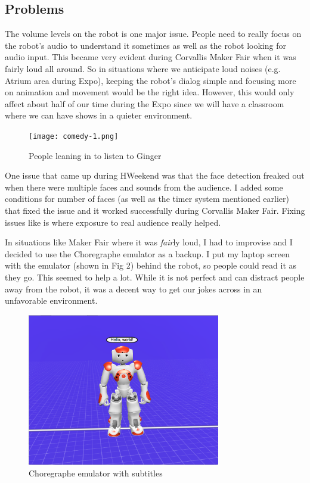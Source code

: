 \documentclass[onecolumn, draftclsnofoot,10pt, compsoc]{IEEEtran}
\begin{document}
\subsection{Problems}
The volume levels on the robot is one major issue. People need to really focus on the robot's audio to understand it sometimes as well as the robot looking for audio input. This became very evident during Corvallis Maker Fair when it was fairly loud all around. So in situations where we anticipate loud noises (e.g. Atrium area during Expo), keeping the robot's dialog simple and focusing more on animation and movement would be the right idea. However, this would only affect about half of our time during the Expo since we will have a classroom where we can have shows in a quieter environment. 

\begin{figure}[H]
  \centering
  \texttt{[image: comedy-1.png]}
  \caption{People leaning in to listen to Ginger}
	\label{fig:comedy-1}
\end{figure}

One issue that came up during HWeekend was that the face detection freaked out when there were multiple faces and sounds from the audience. I added some conditions for number of faces (as well as the timer system mentioned earlier) that fixed the issue and it worked successfully during Corvallis Maker Fair. Fixing issues like is where exposure to real audience really helped.

In situations like Maker Fair where it was \textit{fair}ly loud, I had to improvise and I decided to use the Choregraphe emulator as a backup. I put my laptop screen with the emulator (shown in Fig 2) behind the robot, so people could read it as they go. This seemed to help a lot. While it is not perfect and can distract people away from the robot, it was a decent way to get our jokes across in an unfavorable environment.

\begin{figure}[H]
  \centering
  \includegraphics[width=0.75\textwidth,height=0.75\textheight,keepaspectratio]{comedy-2.png}
  \caption{Choregraphe emulator with subtitles}
	\label{fig:comedy-2}
\end{figure}
\end{document}
